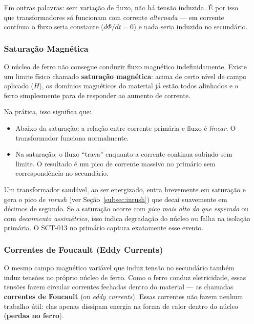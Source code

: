 \documentclass[12pt, a4paper]{article}
\begin{document}
\noindent Em outras palavras: sem variação de fluxo, não há tensão induzida. É por isso que transformadores só funcionam com corrente \emph{alternada} --- em corrente contínua o fluxo seria constante ($d\Phi/dt = 0$) e nada seria induzido no secundário.

\subsubsection{Saturação Magnética}

O núcleo de ferro não consegue conduzir fluxo magnético indefinidamente. Existe um limite físico chamado \textbf{saturação magnética}: acima de certo nível de campo aplicado ($H$), os domínios magnéticos do material já estão todos alinhados e o ferro simplesmente para de responder ao aumento de corrente.

Na prática, isso significa que:
\begin{itemize}[leftmargin=2cm]
    \item Abaixo da saturação: a relação entre corrente primária e fluxo é \emph{linear}. O transformador funciona normalmente.
    \item Na saturação: o fluxo ``trava'' enquanto a corrente continua subindo sem limite. O resultado é um pico de corrente massivo no primário sem correspondência no secundário.
\end{itemize}

\begin{tcolorbox}[caixaAviso, title={Por que a saturação importa para o diagnóstico?}]
Um transformador saudável, ao ser energizado, entra brevemente em saturação e gera o pico de \emph{inrush} (ver Seção~\ref{subsec:inrush}) que decai suavemente em décimos de segundo. Se a saturação ocorre com \emph{pico mais alto do que esperado} ou com \emph{decaimento assimétrico}, isso indica degradação do núcleo ou falha na isolação primária. O SCT-013 no primário captura exatamente esse evento.
\end{tcolorbox}

\subsubsection{Correntes de Foucault (Eddy Currents)}

O mesmo campo magnético variável que induz tensão no secundário também induz tensões no próprio núcleo de ferro. Como o ferro conduz eletricidade, essas tensões fazem circular correntes fechadas dentro do material --- as chamadas \textbf{correntes de Foucault} (ou \textit{eddy currents}). Essas correntes não fazem nenhum trabalho útil: elas apenas dissipam energia na forma de calor dentro do núcleo (\textbf{perdas no ferro}).
\end{document}
